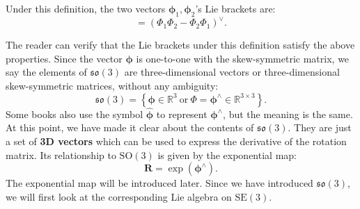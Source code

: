 Under this definition, the two vectors $\boldsymbol{\phi}_1, \boldsymbol{\phi}_2$'s Lie brackets are:
\begin{equation}
[\boldsymbol{\phi}_1, \boldsymbol{\phi}_2] = \left( \mathbf{ \varPhi }_1 \mathbf{ \varPhi }_2 - \mathbf{ \varPhi }_2 \mathbf{ \varPhi }_1 \right)^\vee.
\end{equation}

The reader can verify that the Lie brackets under this definition satisfy the above properties. Since the vector $\boldsymbol{\phi}$ is one-to-one with the skew-symmetric matrix, we say the elements of $\mathfrak{so}(3)$ are three-dimensional vectors or three-dimensional skew-symmetric matrices, without any ambiguity:
\begin{equation}
\mathfrak{so}(3) = \left\{ \boldsymbol{\phi} \in \mathbb{R}^3 \ \text{or}\  \boldsymbol{\varPhi} = \boldsymbol{\phi^\wedge} \in \mathbb{ R}^{3 \times 3} \right\}.
\end{equation}
Some books also use the symbol $\widehat{\boldsymbol{\phi}}$ to represent $\boldsymbol{\phi}^\wedge$, but the meaning is the same. At this point, we have made it clear about the contents of $\mathfrak{so}(3)$. They are just a set of \textbf{3D vectors} which can be used to express the derivative of the rotation matrix. Its relationship to $\mathrm{SO}(3)$ is given by the exponential map:
\begin{equation}
\mathbf{R} = \exp ( \boldsymbol{\phi}^\wedge ).
\end{equation}
The exponential map will be introduced later. Since we have introduced $\mathfrak{so}(3)$, we will first look at the corresponding Lie algebra on $\mathrm{SE}(3)$.

